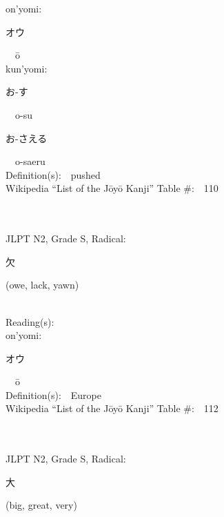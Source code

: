 \begin{multicols}{2}
{\hspace*{1em}}on'yomi:\ \ \\
{\hspace*{2em}}{\begin{CJK}{UTF8}{min} オウ \end{CJK}}\ \ \=o\ \ \\
{\hspace*{1em}}kun'yomi:\ \ \\
{\hspace*{2em}}{\begin{CJK}{UTF8}{min} お-す \end{CJK}}\ \ o-su\ \ \\
{\hspace*{2em}}{\begin{CJK}{UTF8}{min} お-さえる \end{CJK}}\ \ o-saeru\ \ \\
Definition(s):\ \ pushed \\
Wikipedia ``List of the J\=oy\=o Kanji'' Table \#:\ \ 110 \\
\ \ \\
{\fontsize{34pt}{40pt}  }\ \ \\  %
{JLPT N2, Grade S, Radical:\ \ {\begin{CJK}{UTF8}{min} 欠 \end{CJK}} (owe, lack, yawn) } \\
Reading(s):\ \ \\
{\hspace*{1em}}on'yomi:\ \ \\
{\hspace*{2em}}{\begin{CJK}{UTF8}{min} オウ \end{CJK}}\ \ \=o\ \ \\
Definition(s):\ \ Europe \\
Wikipedia ``List of the J\=oy\=o Kanji'' Table \#:\ \ 112 \\
\ \ \\
{\fontsize{34pt}{40pt}  }\ \ \\  %
{JLPT N2, Grade S, Radical:\ \ {\begin{CJK}{UTF8}{min} 大 \end{CJK}} (big, great, very) } \\

\end{multicols}
